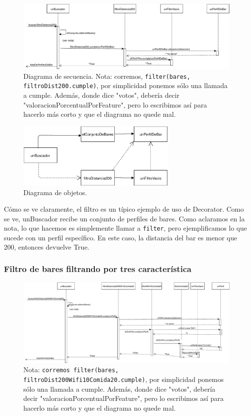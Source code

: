 \begin{figure}[H]
  \centering
  \includegraphics[width=\textwidth]{diagramas/secuencia_2.pdf}
  \caption{\normalfont Diagrama de secuencia. Nota: corremos, \texttt{filter(bares, filtroDist200.cumple)}, por simplicidad ponemos sólo una llamada a cumple.
Además, donde dice "votos", debería decir "valoracionPorcentualPorFeature", pero lo escribimos así para hacerlo más corto y que el diagrama no quede mal.
	}
\end{figure}

\begin{figure}[H]
  \centering
  \includegraphics[width=0.7\textwidth]{diagramas/objetos_2.pdf}
  \caption{\normalfont Diagrama de objetos.}
\end{figure}

Cómo se ve claramente, el filtro es un típico ejemplo de uso de Decorator. Como se ve, unBuscador recibe un conjunto de perfiles de bares. Como aclaramos en la nota, lo que hacemos es simplemente llamar a \texttt{filter}, pero ejemplificamos lo que sucede con un perfil específico. En este caso, la distancia del bar es menor que 200, entonces devuelve True.

\subsubsection{Filtro de bares filtrando por tres característica}

\begin{figure}[H]
  \centering
  \includegraphics[width=\textwidth]{diagramas/secuencia_3.pdf}
  \caption{\normalfont Nota: \texttt{corremos filter(bares, filtroDist200Wifi10Comida20.cumple)}, por simplicidad ponemos sólo una llamada a cumple.
Además, donde dice "votos", debería decir "valoracionPorcentualPorFeature", pero lo escribimos así para hacerlo más corto y que el diagrama no quede mal.
}
\end{figure}


